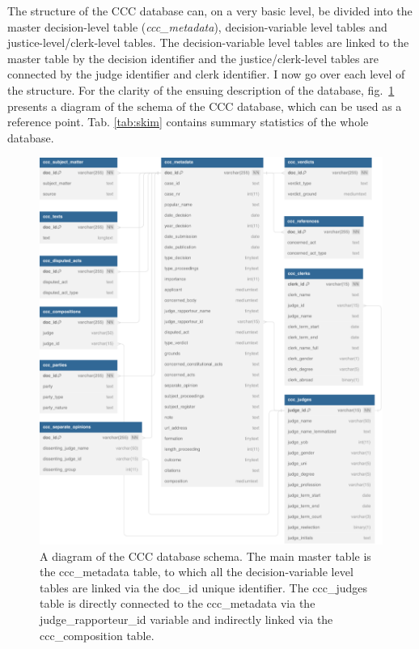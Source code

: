 \documentclass[
  11pt,
]{article}
\begin{document}
The structure of the CCC database can, on a very basic level, be divided into the master decision-level table (\emph{ccc\_metadata}), decision-variable level tables and justice-level/clerk-level tables. The decision-variable level tables are linked to the master table by the decision identifier and the justice/clerk-level tables are connected by the judge identifier and clerk identifier. I now go over each level of the structure. For the clarity of the ensuing description of the database, fig.~\ref{fig:database-diagram} presents a diagram of the schema of the CCC database, which can be used as a reference point. Tab. \ref{tab:skim} contains summary statistics of the whole database.

\begin{figure}
\centering
\includegraphics{The_Czech_Constitutional_Court_Database_files/figure-latex/database-diagram-1.pdf}
\caption{\label{fig:database-diagram}A diagram of the CCC database schema. The main master table is the ccc\_metadata table, to which all the decision-variable level tables are linked via the doc\_id unique identifier. The ccc\_judges table is directly connected to the ccc\_metadata via the judge\_rapporteur\_id variable and indirectly linked via the ccc\_composition table.}
\end{figure}
\end{document}

